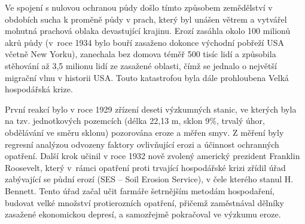 Ve spojení s nulovou ochranou půdy došlo tímto způsobem zemědělství v
obdobích sucha k proměně půdy v prach, který byl unášen větrem a
vytvářel mohutná prachová oblaka devastující krajinu. Erozí zasáhla
okolo 100 milionů akrů půdy (v~roce 1934 bylo bouří zasaženo dokonce
východní pobřeží USA včetně New Yorku), zanechala bez domova téměř 500
tisíc lidí a způsobila stěhování až 3,5 milionu lidí ze zasažené
oblasti, čímž se jednalo o největší migrační vlnu v historii
USA. Touto katastrofou byla dále prohloubena Velká hospodářská krize.

První reakcí bylo v roce 1929 zřízení deseti výzkumných stanic, ve
kterých byla na tzv. jednotkových pozemcích (délka 22,13 m, sklon
9$\%$, trvalý úhor, obdělávání ve směru sklonu) pozorována eroze a
měřen smyv. Z měření byly regresní analýzou odvozeny faktory
ovlivňující erozi a účinnost ochranných opatření. Další krok učinil v
roce 1932 nově zvolený americký prezident Franklin Roosevelt, který v~rámci opatření proti trvající hospodářské krizi zřídil úřad zabývající
se půdní erozí (SES – Soil Erosion Service), v čele kterého stanul
H. Bennett. Tento úřad začal učit farmáře šetrnějším metodám
hospodaření, budovat velké množství protierozních opatření, přičemž
zaměstnával dělníky zasažené ekonomickou depresí, a \hbox{samozřejmě}
pokračoval ve výzkumu eroze.\cite{Bonnifield1979}\cite{Egan2006}

